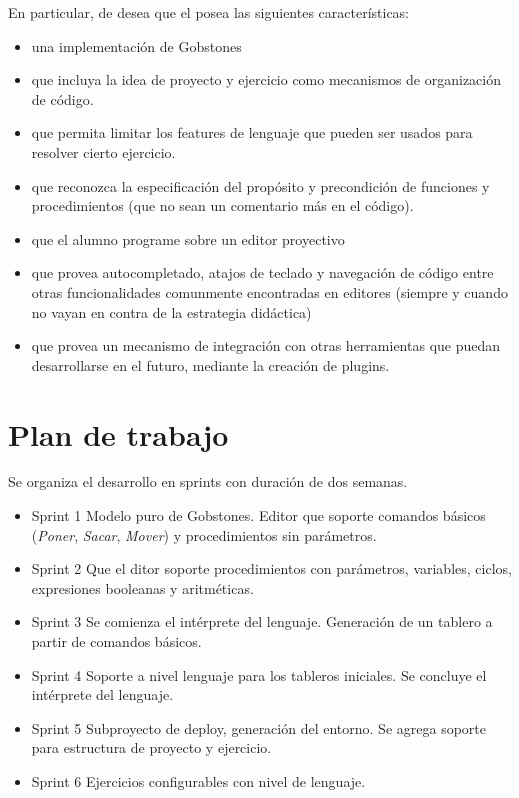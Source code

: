 En particular, de desea que el \ile posea las siguientes características:

\begin{itemize}
  \item una implementación de Gobstones
  \item que incluya la idea de proyecto y ejercicio como mecanismos de organización de código.
  \item que permita limitar los features de lenguaje que pueden ser usados para resolver cierto ejercicio.
  \item que reconozca la especificación del propósito y precondición de funciones y procedimientos (que no sean un comentario más en el código).
  \item que el alumno programe sobre un editor proyectivo
  \item que provea autocompletado, atajos de teclado y navegación de código entre otras funcionalidades comunmente encontradas en editores (siempre y cuando no vayan en contra de la estrategia didáctica)
  \item que provea un mecanismo de integración con otras herramientas que puedan desarrollarse en el futuro, mediante la creación de plugins.
\end{itemize}


\section{Plan de trabajo}

Se organiza el desarrollo en sprints con duración de dos semanas.

\begin{itemize}
  \item{Sprint 1} Modelo puro de Gobstones. Editor que soporte comandos básicos (\textit{Poner}, \textit{Sacar}, \textit{Mover}) y procedimientos sin parámetros.
  \item{Sprint 2} Que el ditor soporte procedimientos con parámetros, variables, ciclos, expresiones booleanas y aritméticas.
  \item{Sprint 3} Se comienza el intérprete del lenguaje. Generación de un tablero a partir de comandos básicos.
  \item{Sprint 4} Soporte a nivel lenguaje para los tableros iniciales. Se concluye el intérprete del lenguaje. 
  \item{Sprint 5} Subproyecto de deploy, generación del entorno. Se agrega soporte para estructura de proyecto y ejercicio.
  \item{Sprint 6} Ejercicios configurables con nivel de lenguaje.
\end{itemize} 



